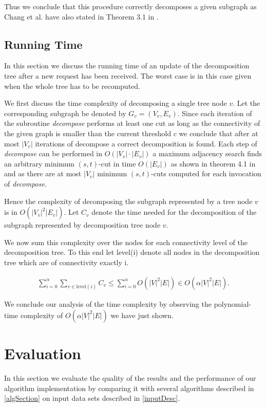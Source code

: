 \documentclass[a4paper,xcolor=dvipsnames, tikz, 12pt]{article}
\theoremstyle{definition}
\begin{document}
Thus we conclude that this procedure correctly decomposes a given subgraph as Chang et al. have also stated in Theorem 3.1 in \cite{Chang2013}.


\subsection{Running Time}
\label{run_time_sec}
In this section we discuss the running time of an update of the decomposition tree after a new request has been received. The worst case is in this case given when the whole tree has to be recomputed.

We first discuss the time complexity of decomposing a single tree node $v$. Let the corresponding subgraph be denoted by $G_v=(V_v, E_v)$.
Since each iteration of the subroutine \textit{decompose} performs at least one cut as long as the connectivity of the given graph is smaller than the current threshold $c$ we conclude that after at most $|V_v|$ iterations of decompose a correct decomposition is found. Each step of \textit{decompose } can be performed in $O(|V_v|\cdot|E_v|)$ a maximum adjacency search finds an arbitrary minimum $(s,t)$-cut in time $O(|E_v|)$ as shown in theorem 4.1 in \cite{Chang2013} and as there are at most $|V_v|$ minimum $(s,t)$-cuts computed for each invocation of \textit{decompose}.

Hence the complexity of decomposing the subgraph represented by a tree node $v$ is in $O(|V_v|^2|E_v|)$. Let $C_v$ denote the time needed for the decomposition of the subgraph represented  by decomposition tree node $v$.

We now sum this complexity over the nodes for each connectivity level of the decomposition tree. To this end let level(i) denote all nodes in the decomposition tree which are of connectivity exactly i.

\begin{align*}
	\sum_{i=0}^{\alpha}\sum_{v\in \text{level}(i)}C_v\leq\sum_{i=0}^{\alpha}O(|V|^2|E|)\in O(\alpha|V|^2|E|).
\end{align*}

We conclude our analysis of the time complexity by observing the polynomial-time complexity of $O(\alpha|V|^2|E|)$ we have just shown.


\section{Evaluation}
In this section we evaluate the quality of the results and the performance of our algorithm implementation by comparing it with several algorithms described in \cref{algSection} on input data sets described in \cref{inputDesc}.
\end{document}
